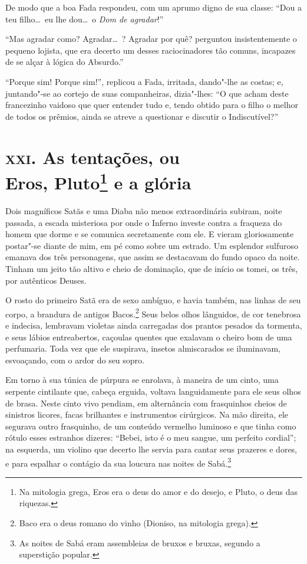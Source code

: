 De modo que a boa Fada respondeu, com um aprumo digno de sua classe:
``Dou a teu filho\ldots\  eu lhe dou\ldots\  o \textit{Dom de
agradar}!''

``Mas agradar como? Agradar\ldots\ ? Agradar por quê? perguntou insistentemente 
o pequeno lojista, que era decerto um desses
raciocinadores tão comuns, incapazes de se alçar à lógica do
Absurdo.''

``Porque sim! Porque sim!'', replicou a Fada,
irritada, dando"-lhe as costas; e, juntando"-se ao cortejo de suas
companheiras, dizia"-lhes: ``O que acham deste
francezinho vaidoso que quer entender tudo e, tendo obtido para o filho o 
melhor de todos os prêmios, ainda se atreve a questionar e discutir o
Indiscutível?''

\chapter[\textsc{xxi.} As tentações, ou Eros, Pluto]{\textsc{xxi.} As tentações, ou\\ Eros, Pluto\footnote[*]{Na mitologia  grega, Eros era o deus do amor e do desejo, e Pluto, o deus das riquezas.} e a glória}

Dois magníficos Satãs e uma Diaba não menos extraordinária subiram,
noite passada, a escada misteriosa por onde o Inferno investe contra a
fraqueza do homem que dorme e se comunica secretamente com ele. E 
vieram gloriosamente postar"-se diante de mim, em pé como sobre um
estrado. Um esplendor sulfuroso emanava dos três personagens, que
assim se destacavam do fundo opaco da noite. Tinham um jeito tão altivo
e cheio de dominação, que de início os tomei, os três, por autênticos Deuses.

O rosto do primeiro Satã era de sexo ambíguo, e havia também, nas linhas
de seu corpo, a brandura de antigos Bacos.\footnote{ Baco era o deus 
romano do vinho (Dioniso, na mitologia grega).}
Seus belos olhos lânguidos, de cor tenebrosa e indecisa, lembravam
violetas ainda carregadas dos prantos pesados da tormenta, e seus
lábios entreabertos, caçoulas quentes que exalavam o cheiro
bom de uma perfumaria. Toda vez que ele suspirava, insetos
almiscarados se iluminavam, esvoaçando, com o ardor do seu sopro.

Em torno à sua túnica de púrpura se enrolava, à maneira de um cinto,
uma serpente cintilante que, cabeça erguida, voltava
languidamente para ele seus olhos de brasa. Neste cinto vivo pendiam, em alternância com frasquinhos cheios de sinistros licores,
facas brilhantes e instrumentos cirúrgicos. Na mão direita, ele segurava
outro frasquinho, de um conteúdo vermelho luminoso e que
tinha como rótulo esses estranhos dizeres: ``Bebei,
isto é o meu sangue, um perfeito
cordial''; na esquerda,
um violino que decerto lhe servia para cantar seus prazeres e
dores, e para espalhar o contágio da sua loucura nas noites de
Sabá.\footnote{ As noites de Sabá eram assembleias de bruxos e bruxas, segundo a
superstição popular.}

